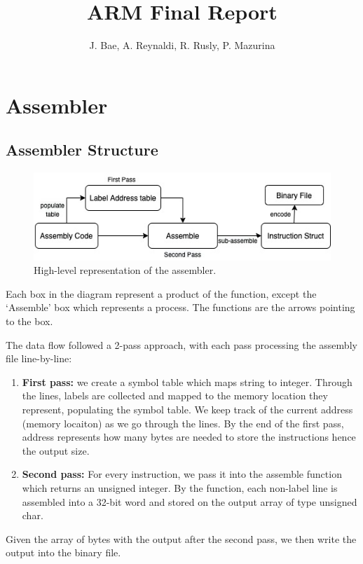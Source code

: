 \documentclass[11pt]{article}
\begin{document}
\title{ARM Final Report}
\author{J. Bae, A. Reynaldi, R. Rusly, P. Mazurina}

\maketitle

\section{Assembler}
\subsection{Assembler Structure}
\begin{figure}[h]
  \centering
  \includegraphics[width=0.7\linewidth]{assembler_structure.jpeg}
  \caption{High-level representation of the assembler.}
\end{figure}
Each box in the diagram represent a product of the function, except the ‘Assemble’ box which represents a process. The functions are the arrows pointing to the box.

The data flow followed a 2-pass approach, with each pass processing the assembly file line-by-line:
\begin{enumerate}
    \item \textbf{First pass:} we create a symbol table which maps string to integer. Through the lines, labels are collected and mapped to the memory location they represent, populating the symbol table. We keep track of the current address (memory locaiton) as we go through the lines. By the end of the first pass, address represents how many bytes are needed to store the instructions hence the output size.
    \item \textbf{Second pass:} For every instruction, we pass it into the assemble function which returns an unsigned integer. By the function, each non-label line is assembled into a 32-bit word and stored on the output array of type unsigned char.
\end{enumerate}
Given the array of bytes with the output after the second pass, we then write the output into the binary file.
\end{document}
